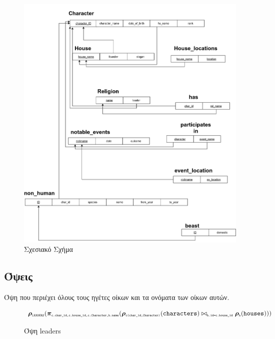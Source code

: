 \documentclass[../main.tex]{subfiles}
\begin{document}
\begin{figure}[H]
	\includegraphics[width=\textwidth]{../images/relation_diagram.png}
	\caption{Σχεσιακό Σχήμα}
\end{figure}

\subsection{Όψεις}

\newcommand{\tsub}[1]{\texttt{\tiny#1}}

\noindent
Όψη που περιέχει όλους τους ηγέτες οίκων και τα ονόματα των οίκων
αυτών.
\begin{figure}[H]
  \begin{equation}
    \bm{\rho}_{\tsub{LEADERS}}
    (
    \bm{\pi}_{\tsub{c.char\_id,c.house\_id,c.Character,h.name}} (
    \bm{\rho}_{\tsub{c(char\_id,Character)}}(\texttt{characters})
    \bowtie_{\tsub{h.id=c.house\_id}}
    \bm{\rho}_{\tsub{h}}(\texttt{houses})
    ))
  \end{equation}
  \caption{Όψη leaders}
\end{figure}
\end{document}
